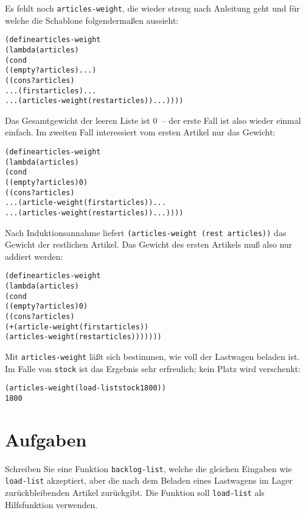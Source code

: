 %
Es fehlt noch \texttt{articles-weight}, die wieder streng nach Anleitung
geht und für welche die Schablone folgendermaßen aussieht:
%
\begin{alltt}
(define articles-weight
  (lambda (articles)
    (cond
     ((empty? articles) ...)
     ((cons? articles)
      ... (first articles) ...
      ... (articles-weight (rest articles)) ...))))
\end{alltt}
%
Das Gesamtgewicht der leeren Liste ist 0~-- der erste Fall ist also
wieder einmal einfach.  Im zweiten Fall interessiert vom ersten
Artikel nur das Gewicht:
%
\begin{alltt}
(define articles-weight
  (lambda (articles)
    (cond
     ((empty? articles) 0)
     ((cons? articles)
      ... (article-weight (first articles)) ...
      ... (articles-weight (rest articles)) ...))))
\end{alltt}
%
Nach Induktionsannahme liefert \texttt{(articles-weight (rest articles))} das
Gewicht der restlichen Artikel.  Das Gewicht des ersten Artikels muß also
nur addiert werden:
%
\begin{alltt}
(define articles-weight
  (lambda (articles)
    (cond
     ((empty? articles) 0)
     ((cons? articles)
      (+ (article-weight (first articles))
         (articles-weight (rest articles)))))))
\end{alltt}
%
Mit \texttt{articles-weight} läßt sich bestimmen, wie voll der
Lastwagen beladen ist.  Im Falle von \texttt{stock} ist das
Ergebnis sehr erfreulich; kein Platz wird verschenkt:
%
\begin{alltt}
(articles-weight (load-list stock 1800))
\evalsto{} 1800
\end{alltt}

\section*{Aufgaben}

\begin{aufgabe}
  Schreiben Sie eine Funktion \texttt{backlog-list}, welche die
  gleichen Eingaben wie \texttt{load-list} akzeptiert, aber die
  nach dem Beladen eines Lastwagens im Lager zurückbleibenden Artikel
  zurückgibt.  Die Funktion soll 
  \texttt{load-list} als Hilfsfunktion verwenden.
\end{aufgabe}

